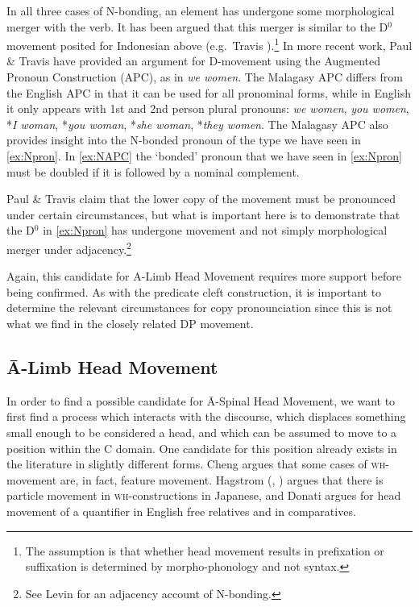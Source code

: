 \documentclass[output=paper,colorlinks,citecolor=brown,
]{langscibook}
\begin{document}
In all three cases of N-bonding, an element has undergone some morphological merger with the verb. It has been argued that this merger is similar to the D$^0$ movement posited for Indonesian above (e.g.\ Travis \citeyear{Travis:2006}).\footnote{The assumption is that whether head movement results in prefixation or suffixation is determined by morpho-phonology and not syntax.}  In more recent work, Paul \& Travis \citeyearpar{Paul:2019} have provided an argument for D-movement using the Augmented Pronoun Construction (APC), as in \textit{we women}.  The Malagasy APC differs from the English APC in that it can be used for all pronominal forms, while in English it only appears with 1st and 2nd person plural pronouns: \textit{we women}, \textit{you women}, *\textit{I woman}, *\textit{you woman}, *\textit{she woman}, *\textit{they women}.  The Malagasy APC also provides insight into the N-bonded pronoun of the type we have seen in \ref{ex:Npron}.  In \ref{ex:NAPC} the 	`bonded' pronoun that we have seen in \ref{ex:Npron} must be doubled if it is followed by a nominal complement.


Paul \& Travis claim that the lower copy of the movement must be pronounced under certain circumstances, but what is important here is to demonstrate that the D$^0$ in \ref{ex:Npron} has undergone movement and not simply morphological merger under adjacency.\footnote{See Levin \citeyearpar{Levin:2015} for an adjacency account of N-bonding.}

Again, this candidate for A-Limb Head Movement requires more support before being confirmed. As with the predicate cleft construction, it is important to determine the relevant circumstances for copy pronounciation since this is not what we find in the closely related DP movement.

\subsection{\=A-Limb Head Movement}

In order to find a possible candidate for \=A-Spinal Head Movement, we want to first find a process which interacts with the discourse, which displaces something small enough to be considered a head, and which can be assumed to move to a position within the C domain.  One candidate for this position already exists in the literature in slightly different forms.  Cheng \citeyearpar{Cheng:2000b} argues that some cases of \textsc{wh-}movement are, in fact,  feature movement.  Hagstrom (\citeyear{Hagstrom:2000}, \citeyear{Hagstrom:2004}) argues that there is particle movement in \textsc{wh}-constructions in Japanese,  and Donati \citeyearpar{Donati:2006} argues for head movement of a quantifier in English free relatives and in comparatives.  
\end{document}
